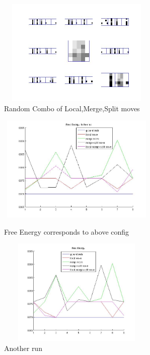\documentclass{article}
\begin{document}
\begin{spacing}{1.1}
\begin{enumerate}
\begin{figure}[h]
  \begin{minipage}[b]{0.5\textwidth} 
    \centering 
    \includegraphics[width=3in,height=2in]{bu_lms.jpg} 
    \caption{Random Combo of Local,Merge,Split moves}
    \label{fig:by:table}  
   \end{minipage}%
\end{figure}

\begin{figure}[h] 
  \begin{minipage}[b]{0.5\textwidth} 
    \centering 
    \includegraphics[width=3in,height=2in]{bu_energy2.jpg} 
    \caption{Free Energy corresponds to above config}
    \label{fig:by:table} 
  \end{minipage}%
  \begin{minipage}[b]{0.5\textwidth} 
    \centering 
    \includegraphics[width=3in,height=2in]{bu_energy.jpg} 
    \caption{Another run}
    \label{fig:by:table}  
   \end{minipage}%
\end{figure}
\end{enumerate}


\end{spacing}
\end{document}
